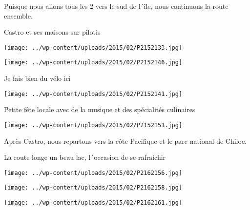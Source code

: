  Puisque nous allons tous les 2 vers le sud de l´île, nous continuons la route ensemble.

 Castro et ses maisons sur pilotis

 

\begin{center} \texttt{[image: ../wp-content/uploads/2015/02/P2152133.jpg]} \end{center}



 

\begin{center} \texttt{[image: ../wp-content/uploads/2015/02/P2152146.jpg]} \end{center}



 Je fais bien du vélo ici

 

\begin{center} \texttt{[image: ../wp-content/uploads/2015/02/P2152141.jpg]} \end{center}



 Petite fête locale avec de la musique et des spécialités culinaires

 

\begin{center} \texttt{[image: ../wp-content/uploads/2015/02/P2152151.jpg]} \end{center}



 Après Castro, nous repartons vers la côte Pacifique et le parc national de Chiloe.

 La route longe un beau lac, l´occasion de se rafraichir

 

\begin{center} \texttt{[image: ../wp-content/uploads/2015/02/P2162156.jpg]} \end{center}



 

\begin{center} \texttt{[image: ../wp-content/uploads/2015/02/P2162158.jpg]} \end{center}



 

\begin{center} \texttt{[image: ../wp-content/uploads/2015/02/P2162161.jpg]} \end{center}



